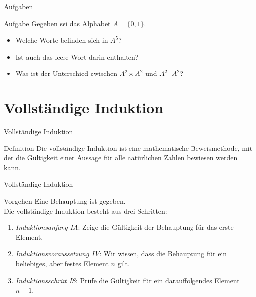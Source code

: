 \begin{frame}{Aufgaben}
    \begin{exampleblock}{Aufgabe}
        Gegeben sei das Alphabet $A = \{ 0, 1\}$.
        \begin{itemize}
            \item Welche Worte befinden sich in $A^5$?
                \pause
            \item Ist auch das leere Wort darin enthalten?
                \pause
            \item Was ist der Unterschied zwischen $A^2 \times A^2$ und $A^2 \cdot A^2$?
        \end{itemize}
    \end{exampleblock}
\end{frame}

\section{Vollständige Induktion}
\begin{frame}{Vollständige Induktion}
    \begin{block}{Definition}
        Die vollständige Induktion ist eine mathematische Beweismethode, mit der die Gültigkeit einer Aussage für alle natürlichen Zahlen bewiesen werden kann.
    \end{block}
\end{frame}
\begin{frame}{Vollständige Induktion}
    \begin{block}{Vorgehen}
        Eine Behauptung ist gegeben.\\\pause
        Die vollständige Induktion besteht aus drei Schritten:
        \begin{enumerate}
            \item \emph{Induktionsanfang IA}: Zeige die Gültigkeit der Behauptung für das erste Element.
                \pause
            \item \emph{Induktionsvoraussetzung IV}: Wir wissen, dass die Behauptung für ein beliebiges, aber festes Element $n$ gilt.
                \pause
            \item \emph{Induktionsschritt IS}: Prüfe die Gültigkeit für ein darauffolgendes Element $n+1$.
        \end{enumerate}
    \end{block}
\end{frame}


